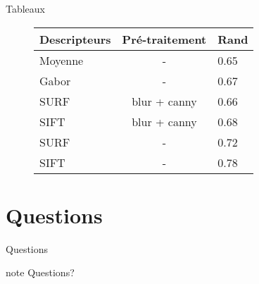 \documentclass[xcolor=table]{beamer}
\begin{document}
	\begin{frame}{Tableaux}
		\begin{figure}[!h]
			\centering
			\begin{tabular}{ | l | c | l | }
				\hline
				Descripteurs & Pré-traitement & Rand \\
				\hline
					Moyenne &	-			 & 0.65\\
					Gabor	&	-			 & 0.67\\
					SURF 	& 	blur + canny & 0.66\\
					SIFT 	&	blur + canny & 0.68\\
					SURF 	& 	- 			 & 0.72\\
					SIFT 	&	-			 & 0.78\\
				\hline  
			\end{tabular}
		\end{figure}
	\end{frame}

	\section{Questions}
	\begin{frame}{Questions}
	    \begin{beamercolorbox}[center,shadow=true,rounded=true,]{note} 
	        \huge{Questions?}
	    \end{beamercolorbox} 
	\end{frame} 
\end{document}
